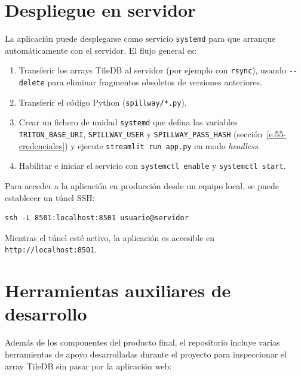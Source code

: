\section{Despliegue en servidor}\label{e.7-despliegue-servidor}

La aplicación puede desplegarse como servicio \texttt{systemd} para que arranque automáticamente con el servidor. El flujo general es:

\begin{enumerate}
\item Transferir los arrays TileDB al servidor (por ejemplo con \texttt{rsync}), usando \texttt{-\/-delete} para eliminar fragmentos obsoletos de versiones anteriores.

\item Transferir el código Python (\texttt{spillway/*.py}).

\item Crear un fichero de unidad \texttt{systemd} que defina las variables \texttt{TRITON\_BASE\_URI}, \texttt{SPILLWAY\_USER} y \texttt{SPILLWAY\_PASS\_HASH} (sección~\ref{e.55-credenciales}) y ejecute \texttt{streamlit run app.py} en modo \textit{headless}.

\item Habilitar e iniciar el servicio con \texttt{systemctl enable} y \texttt{systemctl start}.
\end{enumerate}

Para acceder a la aplicación en producción desde un equipo local, se puede establecer un túnel SSH:

\begin{verbatim}
ssh -L 8501:localhost:8501 usuario@servidor
\end{verbatim}

Mientras el túnel esté activo, la aplicación es accesible en \texttt{http://localhost:8501}.

\section{Herramientas auxiliares de desarrollo}\label{e.8-herramientas-auxiliares}

Además de los componentes del producto final, el repositorio incluye varias herramientas de apoyo desarrolladas durante el proyecto para inspeccionar el array TileDB sin pasar por la aplicación web:

